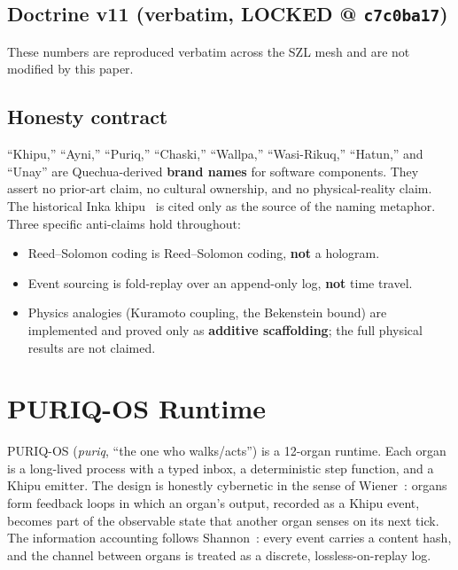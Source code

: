 \documentclass[11pt]{article}
\theoremstyle{plain}
\theoremstyle{definition}
\theoremstyle{remark}
\begin{document}
\subsection{Doctrine v11 (verbatim, LOCKED @ \texttt{c7c0ba17})}
\begin{center}\end{center}
These numbers are reproduced verbatim across the SZL mesh and are not modified by this
paper.

\subsection{Honesty contract}
``Khipu,'' ``Ayni,'' ``Puriq,'' ``Chaski,'' ``Wallpa,'' ``Wasi-Rikuq,'' ``Hatun,'' and
``Unay'' are Quechua-derived \textbf{brand names} for software components. They assert no
prior-art claim, no cultural ownership, and no physical-reality claim. The historical
Inka khipu~\cite{urton2003} is cited only as the source of the naming metaphor. Three
specific anti-claims hold throughout:
\begin{itemize}[leftmargin=1.4em]
\item Reed--Solomon coding is Reed--Solomon coding, \textbf{not} a hologram.
\item Event sourcing is fold-replay over an append-only log, \textbf{not} time travel.
\item Physics analogies (Kuramoto coupling, the Bekenstein bound) are implemented and
proved only as \textbf{additive scaffolding}; the full physical results are not claimed.
\end{itemize}

\section{PURIQ-OS Runtime}
\label{sec:runtime}

PURIQ-OS (\emph{puriq}, ``the one who walks/acts'') is a 12-organ runtime. Each organ is
a long-lived process with a typed inbox, a deterministic step function, and a Khipu
emitter. The design is honestly cybernetic in the sense of Wiener~\cite{wiener1948}:
organs form feedback loops in which an organ's output, recorded as a Khipu event, becomes
part of the observable state that another organ senses on its next tick. The information
accounting follows Shannon~\cite{shannon1948}: every event carries a content hash, and
the channel between organs is treated as a discrete, lossless-on-replay log.
\end{document}
